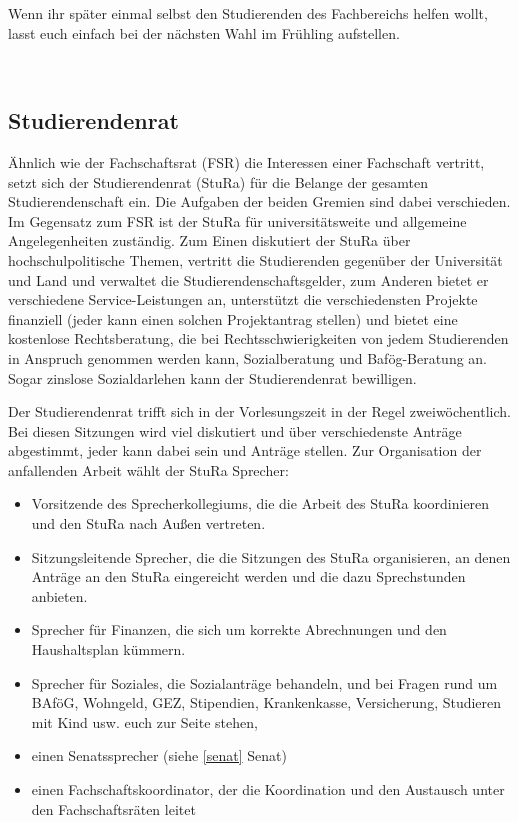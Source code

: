 Wenn ihr später einmal selbst den Studierenden des Fachbereichs helfen wollt, lasst euch einfach bei der nächsten Wahl im Frühling aufstellen.

\\

\subsection{Studierendenrat}

Ähnlich wie der Fachschaftsrat (FSR) die Interessen einer Fachschaft vertritt, setzt sich der Studierendenrat (StuRa) für die Belange der gesamten Studierendenschaft ein.
Die Aufgaben der beiden Gremien sind dabei verschieden.
Im Gegensatz zum FSR ist der StuRa für universitätsweite und allgemeine Angelegenheiten zuständig.
Zum Einen diskutiert der StuRa über hochschulpolitische Themen,  vertritt die Studierenden gegenüber der Universität und Land und verwaltet die Studierendenschaftsgelder, zum Anderen bietet er verschiedene Service-Leistungen an, unterstützt die verschiedensten Projekte finanziell (jeder kann einen solchen Projektantrag stellen) und bietet eine kostenlose Rechtsberatung, die bei Rechtsschwierigkeiten von jedem Studierenden in Anspruch genommen werden kann, Sozialberatung und Bafög-Beratung an.
Sogar zinslose Sozialdarlehen kann der Studierendenrat bewilligen.

Der Studierendenrat trifft sich in der Vorlesungszeit in der Regel zweiwöchentlich.
Bei diesen Sitzungen wird viel diskutiert und über verschiedenste Anträge abgestimmt, jeder kann dabei sein und Anträge stellen.
Zur Organisation der anfallenden Arbeit wählt der StuRa Sprecher:

\begin{itemize}
    \item Vorsitzende des Sprecherkollegiums, die die Arbeit des StuRa koordinieren und den StuRa nach Außen vertreten.
    \item Sitzungsleitende Sprecher, die die Sitzungen des StuRa organisieren, an denen Anträge an den StuRa eingereicht werden und die dazu Sprechstunden anbieten.
    \item Sprecher für Finanzen, die sich um korrekte Abrechnungen und den Haushaltsplan kümmern.
    \item Sprecher für Soziales, die Sozialanträge behandeln, und bei Fragen rund um BAföG, Wohngeld, GEZ, Stipendien, Krankenkasse, Versicherung, Studieren mit Kind usw. euch zur Seite stehen,
    \item einen Senatssprecher (siehe \ref{senat} Senat)
    \item einen Fachschaftskoordinator, der die Koordination und den Austausch unter den Fachschaftsräten leitet
\end{itemize}

